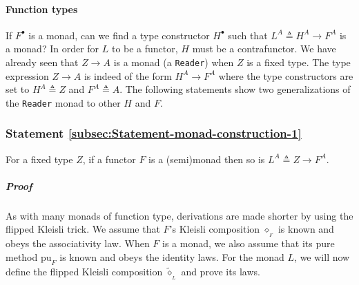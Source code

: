 \paragraph{Function types}

If $F^{\bullet}$ is a monad, can we find a type constructor $H^{\bullet}$
such that $L^{A}\triangleq H^{A}\rightarrow F^{A}$ is a monad? In
order for $L$ to be a functor, $H$ must be a contrafunctor. We have
already seen that $Z\rightarrow A$ is a monad (a \lstinline!Reader!)
when $Z$ is a fixed type. The type expression $Z\rightarrow A$ is
indeed of the form $H^{A}\rightarrow F^{A}$ where the type constructors
are set to $H^{A}\triangleq Z$ and $F^{A}\triangleq A$. The following
statements show two generalizations of the \lstinline!Reader! monad
to other $H$ and $F$.

\subsubsection{Statement \label{subsec:Statement-monad-construction-1}\ref{subsec:Statement-monad-construction-1}}

For a fixed type $Z$, if a functor $F$ is a (semi)monad then so
is $L^{A}\triangleq Z\rightarrow F^{A}$.

\subparagraph{Proof}

As with many monads of function type, derivations are made shorter
by using the flipped Kleisli trick. We assume that $F$\textsf{'}s Kleisli
composition $\diamond_{_{F}}$ is known and obeys the associativity
law. When $F$ is a monad, we also assume that its pure method $\text{pu}_{F}$
is known and obeys the identity laws. For the monad $L$, we will
now define the flipped
Kleisli composition $\tilde{\diamond}_{_{L}}$ and prove its laws.

